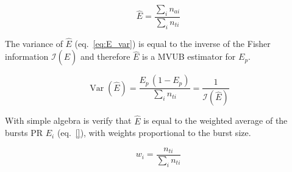 \begin{equation}
\label{eq:E_estim}
\hat{E} = \frac{\sum_i n_{ai}}{\sum_i n_{ti}}
\end{equation}

The variance of $\hat{E}$ (eq.~\ref{eq:E_var}) is equal to the inverse of 
the Fisher information $\mathcal{I}(\hat{E})$ and therefore $\hat{E}$ is a MVUB 
estimator for $E_p$.

\begin{equation}
\label{eq:E_var}
\operatorname{Var}(\hat{E}) = \frac{E_p\,(1 - E_p)}{\sum_i n_{ti}} = \frac{1}{\mathcal{I}(\hat{E})}
\end{equation}

With simple algebra is verify that $\hat{E}$ is equal to the weighted average of the bursts
PR $E_i$ (eq.~\ref{}), with weights proportional to the burst size.

\begin{equation}
\label{eq:weights}
w_i
= \frac{n_{ti}}{\sum_i n_{ti}}
\end{equation}
